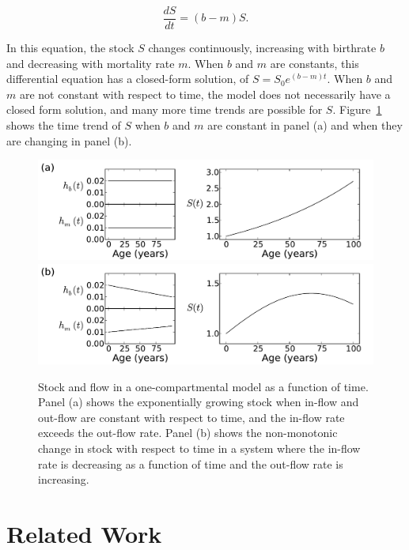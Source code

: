 \[
\frac{dS}{dt} = (b - m)S.
\]

In this equation, the stock $S$ changes continuously, increasing with
birthrate $b$ and decreasing with mortality rate $m$. When $b$ and $m$
are constants, this differential equation has a closed-form solution,
of $S = S_0 e^{(b-m)t}$. When $b$ and $m$ are not constant with
respect to time, the model does not necessarily have a closed form
solution, and many more time trends are possible for $S$.
Figure~\ref{forward-sim-one-compartment-soln} shows the time trend of
$S$ when $b$ and $m$ are constant in panel (a) and when they are
changing in panel (b).

\begin{figure}[h]
\begin{center}
\includegraphics[width=\textwidth]{one_compartment_constant_rate.pdf}
\includegraphics[width=\textwidth]{one_compartment_varying_rate.pdf}
\caption{Stock and flow in a one-compartmental model as a function of
  time. Panel (a) shows the exponentially growing stock when in-flow
  and out-flow are constant with respect to time, and the in-flow rate
  exceeds the out-flow rate.  Panel (b) shows the non-monotonic change
  in stock with respect to time in a system where the in-flow rate is
  decreasing as a function of time and the out-flow rate is
  increasing.}
\label{forward-sim-one-compartment-soln}
\end{center}
\end{figure}


\section{Related Work}

